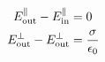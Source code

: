 

\vspace*{\fill}
\centering

\begin{align*}
    E^{\parallel}_{\rm out} - E^{\parallel}_{\rm in} &= 0 \\ 
    E^{\perp}_{\rm out} - E^{\perp}_{\rm out} &= \frac{\sigma}{\epsilon_0}
\end{align*}


\centering
\vspace*{\fill}

